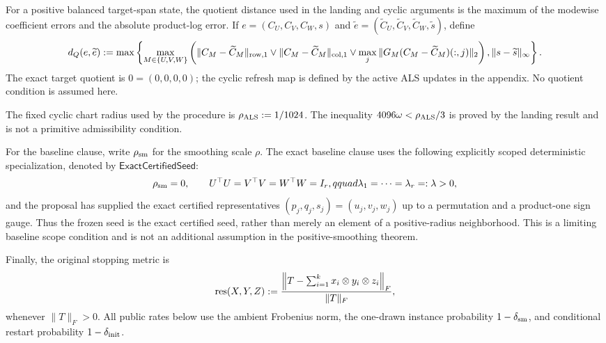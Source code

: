 For a positive balanced target-span state, the quotient distance used in the
landing and cyclic arguments is the maximum of the modewise coefficient
errors and the absolute product-log error.  If
$e=(C_U,C_V,C_W,s)$ and $\widetilde e=(\widetilde C_U,\widetilde C_V,
\widetilde C_W,\widetilde s)$, define
\[
d_Q(e,\widetilde e):=\max\left\{
\max_{M\in\{U,V,W\}}\left(
\|C_M-\widetilde C_M\|_{\rm row,1}\vee
\|C_M-\widetilde C_M\|_{\rm col,1}\vee
\max_j\|G_M(C_M-\widetilde C_M)(:,j)\|_2\right),
\|s-\widetilde s\|_\infty\right\}.
\]
The exact target quotient is $0=(0,0,0,0)$; the cyclic refresh map is
defined by the active ALS updates in the appendix.  No quotient condition is
assumed here.

The fixed cyclic chart radius used by the procedure is
$\rho_{\rm ALS}:=1/1024$.  The inequality
$4096\omega<\rho_{\rm ALS}/3$ is proved by the landing result and is not a
primitive admissibility condition.

For the baseline clause, write $\rho_{\rm sm}$ for the smoothing scale $\rho$.
The exact baseline clause uses the following explicitly scoped deterministic
specialization, denoted by $\mathsf{ExactCertifiedSeed}$:
\[
\rho_{\rm sm}=0,\qquad U^\top U=V^\top V=W^\top W=I_r,qquad
\lambda_1=\cdots=\lambda_r=:\lambda>0,
\]
and the proposal has supplied the exact certified representatives
$(p_j,q_j,s_j)=(u_j,v_j,w_j)$ up to a permutation and a product-one sign
gauge.  Thus the frozen seed is the exact certified seed, rather than merely
an element of a positive-radius neighborhood.  This is a limiting baseline
scope condition and is not an additional assumption in the positive-smoothing
theorem.

Finally, the original stopping metric is
\[
 \operatorname{res}(X,Y,Z):=
 {\left\|T-\sum_{i=1}^k x_i\otimes y_i\otimes z_i\right\|_F\over\|T\|_F},
\]
whenever $\|T\|_F>0$.  All public rates below use the ambient Frobenius norm,
the one-drawn instance probability $1-\delta_{\rm sm}$, and conditional
restart probability $1-\delta_{\rm init}$.

